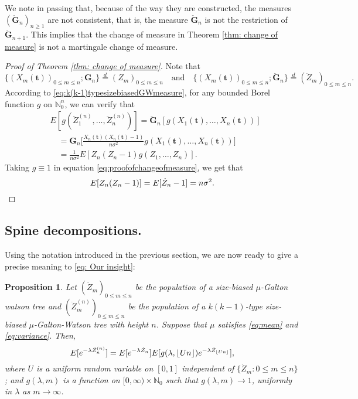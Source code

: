 \documentclass[12pt,a4paper]{amsart}
\DeclarePairedDelimiter\floor{\lfloor}{\rfloor}
\newtheorem{prop}[thm]{Proposition}
\numberwithin{equation}{section}
\begin{document}
	We note in passing that, because of the way they are constructed, the measures $(\ddot{\mathbf G}_n)_{n\ge 1}$ are not consistent, that is, the measure $\ddot{\mathbf G}_n$ is not the restriction of $\ddot{\mathbf G}_{n+1}$.
	This implies that the change of measure in Theorem \ref{thm: change of measure} is not a martingale change of measure.
\medskip
\begin{proof}[Proof of Theorem \ref{thm: change of measure}]
    Note that 
    \[
    \{(X_m( \mathbf t ))_{0\le m\le n}; {\mathbf G}_n\}  \overset{d}{=} (Z_m)_{0\le m\le n}
\quad    \mbox{and} \quad \{(X_m( \mathbf t ))_{0\le m\le n};\ddot{\mathbf G}_n\}  \overset{d}{=} (\ddot Z_m)_{0\le m\le n}.
    \]
    According to \eqref{eq:k(k-1)typesizebiasedGWmeasure}, for any bounded Borel function $g$ on $\mathbb N_0^n$, we can verify that
\begin{equation} \label{eq:proofofchangeofmeasure}
\begin{split}
	&E [ g ( \ddot Z_1^{(n)}, \dots, \ddot Z_n^{(n)})]
	= \ddot{\mathbf G}_n [g ( X_1(  \mathbf t ), \dots, X_n(  \mathbf t ))]
    \\ &\quad = {\mathbf G}_n \big[ \frac { X_n( \mathbf t ) ( X_n( \mathbf t ) - 1)} {n \sigma^2} g (X_1( \mathbf t ), \dots, X_n( \mathbf t ))\big]
	\\&\quad = \frac { 1} { n \sigma^2} E[ Z_n ( Z_n - 1) g( Z_1, \dots, Z_n)].
\end{split}
\end{equation}
	Taking $g\equiv 1$ in equation \eqref{eq:proofofchangeofmeasure}, we get that
\begin{equation}
	\label{eq: second moment}
	E [Z_n(Z_n-1)]= E [\dot Z_n - 1]= n\sigma^2.
	\qedhere
\end{equation}
	\end{proof}

\subsection{Spine decompositions.}
\label{sec:spinesdecomposition}

	Using the	notation
	introduced in the previous	section, we are now ready to
	give a precise meaning to \eqref{eq: Our insight}:
\begin{prop}\label{prop: size-biased add-on of size-biased tree }
	Let $(\dot Z_m)_{0 \leq m \leq n}$ be the population of a size-biased $\mu$-Galton watson tree and $(\ddot Z^{(n)}_m)_{0 \leq m \leq n}$ be the population of a $k(k-1)$-type size-biased $\mu$-Galton-Watson tree with height $n$.
	Suppose that $\mu$ satisfies \eqref{eq:mean} and \eqref{eq:variance}.
	Then,
\[
	E [ e^{- \lambda \ddot Z_n^{(n)}} ]
	= E [e^{-\lambda \dot Z_n}] E[g(\lambda, \floor{Un})e^{-\lambda \dot Z_{\floor{Un}}}],
\]
where $U$ is a uniform random variable on $[0,1]$ independent of $\{\dot Z_m: 0\le m\le n\}$;
and $g(\lambda, m)$ is a function on $[0,\infty) \times \mathbb N_0$ such that
$g(\lambda, m) \to 1$, uniformly in $\lambda$ as $m\to \infty$.
\end{prop}
\end{document}
